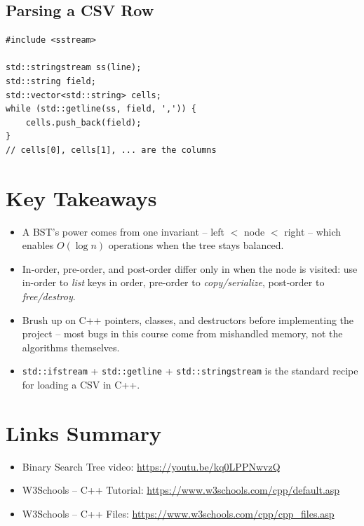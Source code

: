 \documentclass[11pt]{article}
\begin{document}
\subsection*{Parsing a CSV Row}
\begin{lstlisting}[basicstyle=\ttfamily\small,frame=single]
#include <sstream>

std::stringstream ss(line);
std::string field;
std::vector<std::string> cells;
while (std::getline(ss, field, ',')) {
    cells.push_back(field);
}
// cells[0], cells[1], ... are the columns
\end{lstlisting}

\section*{Key Takeaways}
\begin{itemize}[leftmargin=*]
    \item A BST's power comes from one invariant -- left $<$ node $<$
          right -- which enables $O(\log n)$ operations when the tree
          stays balanced.
    \item In-order, pre-order, and post-order differ only in when the
          node is visited: use in-order to \emph{list} keys in order,
          pre-order to \emph{copy/serialize}, post-order to
          \emph{free/destroy}.
    \item Brush up on C++ pointers, classes, and destructors before
          implementing the project -- most bugs in this course come
          from mishandled memory, not the algorithms themselves.
    \item \texttt{std::ifstream} + \texttt{std::getline} +
          \texttt{std::stringstream} is the standard recipe for
          loading a CSV in C++.
\end{itemize}

\section*{Links Summary}
\begin{itemize}[leftmargin=*]
    \item Binary Search Tree video: \url{https://youtu.be/kq0LPPNwvzQ}
    \item W3Schools -- C++ Tutorial: \url{https://www.w3schools.com/cpp/default.asp}
    \item W3Schools -- C++ Files: \url{https://www.w3schools.com/cpp/cpp_files.asp}
\end{itemize}
\end{document}
